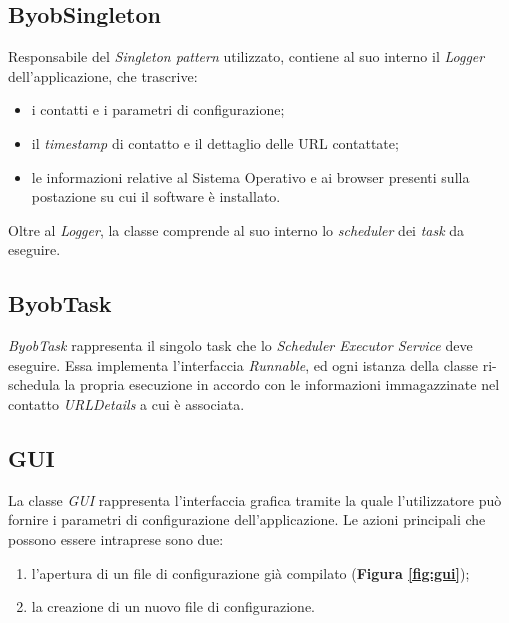 \subsection{ByobSingleton}
Responsabile del \textit{Singleton pattern} utilizzato, contiene al suo interno il \textit{Logger} dell'applicazione, che trascrive:

\begin{itemize}
\item i contatti e i parametri di configurazione;
\item il \textit{timestamp} di contatto e il dettaglio delle URL contattate;
\item le informazioni relative al Sistema Operativo e ai browser presenti sulla postazione su cui il software \`e installato.
\end{itemize}
Oltre al \textit{Logger}, la classe comprende al suo interno lo \textit{scheduler} dei \textit{task} da eseguire.

\vspace*{0.5cm}
\subsection{ByobTask}
\textit{ByobTask} rappresenta il singolo task che lo \textit{Scheduler Executor Service} deve eseguire.
Essa implementa l'interfaccia \textit{Runnable}, ed ogni istanza della classe ri-schedula la propria esecuzione in accordo con le informazioni immagazzinate nel contatto \textit{URLDetails} a cui \`{e} associata.

\vspace*{0.5cm}
\subsection{GUI}

La classe \textit{GUI} rappresenta l'interfaccia grafica tramite la quale l'utilizzatore pu\`{o} fornire i parametri di configurazione dell'applicazione.
Le azioni principali che possono essere intraprese sono due:
\begin{enumerate}
\item l'apertura di un file di configurazione gi\`{a} compilato (\textbf{Figura \ref{fig:gui}});
\item la creazione di un nuovo file di configurazione.
\end{enumerate}

